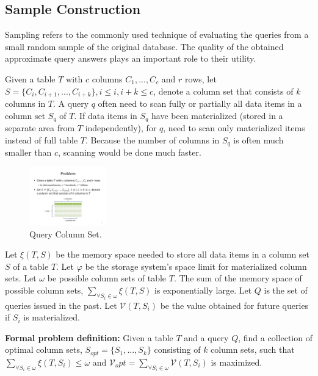 \documentclass{sig-alternate-05-2015}
\begin{document}
\subsection{Sample Construction}
Sampling refers to the commonly used technique of evaluating the queries from a small random sample of the original database. The quality of the obtained approximate query answers plays an important role to their utility.

Given a table $T$ with $c$ columns $C_1, ..., C_c$ and $r$ rows, let $S=\{C_i, C_{i+1}, ..., C_{i+k}\}, i \leq i, i+k \leq c$, denote a column set that consists of $k$ columns in $T$. A query $q$ often need to scan fully or partially all data items in a column set $S_q$ of $T$. If data items in $S_q$ have been materialized (stored in a separate area from $T$ independently), for $q$, need to scan only materialized items instead of full table $T$. Because the number of columns in $S_q$ is often much smaller than $c$, scanning would be done much faster.

\begin{figure}[htb]
        \centering
        \includegraphics[width=0.3\textwidth]{columnset.pdf}
        \caption{Query Column Set.}
        \label{fig:qcs}
\end{figure}

Let $\xi(T, S)$ be the memory space needed to store all data items in a column set $S$ of a table $T$.
Let $\varphi$ be the storage system's space limit for materialized column sets.
Let $\omega$ be possible column sets of table $T$. 
The sum of the memory space of possible column sets, $\sum_{\forall S_i \in \omega} \xi(T, S)$ is exponentially large.
Let $Q$ is the set of queries issued in the past.
Let $\mathcal{V}(T, S_i)$ be the value obtained for future queries if $S_i$ is materialized.

\noindent
\textbf{Formal problem definition:}  Given a table $T$ and a query $Q$, find a collection of optimal column sets, $S_{opt} = \{S_1, ..., S_k\}$ consisting of $k$ column sets, such that $\sum_{\forall S_i \in \omega} \xi(T, S_i) \leq \omega $ and $\mathcal{V}_opt = \sum_{\forall S_i \in \omega} \mathcal{V}(T, S_i) $ is maximized.
\end{document}
